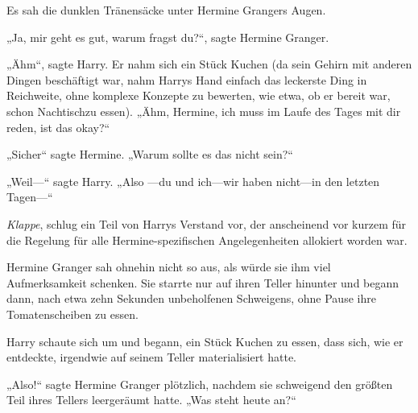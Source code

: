 Es sah die dunklen Tränensäcke unter Hermine Grangers Augen.

„Ja, mir geht es gut, warum fragst du?“, sagte Hermine Granger.

„Ähm“, sagte Harry. Er nahm sich ein Stück Kuchen (da sein Gehirn mit anderen Dingen beschäftigt war, nahm Harrys Hand einfach das leckerste Ding in Reichweite, ohne komplexe Konzepte zu bewerten, wie etwa, ob er bereit war, schon Nachtischzu essen). „Ähm, Hermine, ich muss im Laufe des Tages mit dir reden, ist das okay?“

„Sicher“ sagte Hermine. „Warum sollte es das nicht sein?“

„Weil—“ sagte Harry. „Also —du und ich—wir haben nicht—in den letzten Tagen—“

\emph{Klappe}, schlug ein Teil von Harrys Verstand vor, der anscheinend vor kurzem für die Regelung für alle Hermine-spezifischen Angelegenheiten allokiert worden war.

Hermine Granger sah ohnehin nicht so aus, als würde sie ihm viel Aufmerksamkeit schenken. Sie starrte nur auf ihren Teller hinunter und begann dann, nach etwa zehn Sekunden unbeholfenen Schweigens, ohne Pause ihre Tomatenscheiben zu essen.

Harry schaute sich um und begann, ein Stück Kuchen zu essen, dass sich, wie er entdeckte, irgendwie auf seinem Teller materialisiert hatte.

„Also!“ sagte Hermine Granger plötzlich, nachdem sie schweigend den größten Teil ihres Tellers leergeräumt hatte. „Was steht heute an?“

